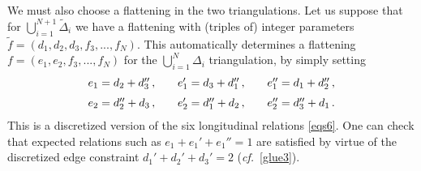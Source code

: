 \documentclass[12pt]{amsart}
\newcommand{\lbl}{\label}
\theoremstyle{definition}
\def\be{  \begin{equation} }
\def\ee{  \end{equation} }
\newcommand{\wt}{\widetilde}
\newcommand{\cf}{\emph{cf.}}
\numberwithin{equation}{section}
\begin{document}
We must also choose a flattening in the two triangulations. Let us suppose 
that for $\bigcup_{i=1}^{N+1}\wt \Delta_i$ we have a flattening with 
(triples of) integer parameters $\wt f=(d_1,d_2,d_3,f_3,...,f_N)$. This 
automatically determines a flattening $ f= (e_1,e_2,f_3,...,f_N)$ for the 
$\bigcup_{i=1}^{N} \Delta_i$ triangulation, by simply setting
%
\be 
\lbl{flat6}
\begin{array}{c@{\qquad}c@{\qquad}c}
e_1=d_2+d_3''\,,& e_1'=d_3+d_1''\,,&  e_1''=d_1+d_2''\,, \\[.2cm]
e_2 = d_2''+d_3\,,& e_2'=d_1''+d_2\,,& e_2''=d_3''+d_1\,.
\end{array}
\ee
%
This is a discretized version of the six longitudinal relations 
\eqref{eqs6}. One can check that expected relations such as 
$e_1+e_1'+e_1''=1$ are satisfied by virtue of the discretized 
edge constraint $d_1'+d_2'+d_3'=2$ (\cf\ \eqref{glue3}).
\end{document}
